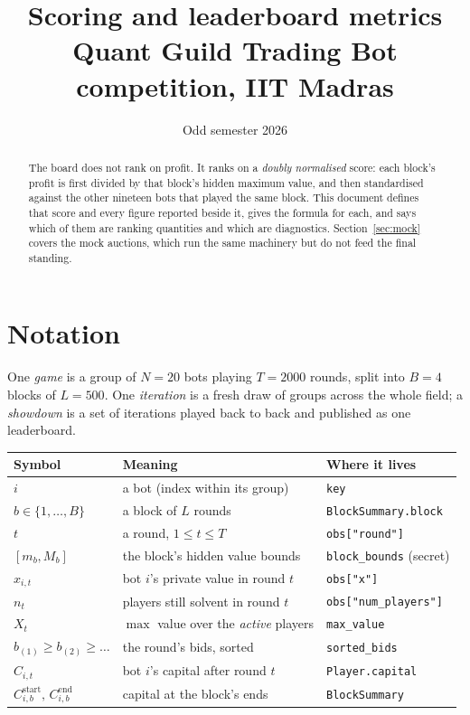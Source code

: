 \documentclass[11pt,a4paper]{article}
\title{\textbf{Scoring and leaderboard metrics}\\[2mm]
       \large Quant Guild Trading Bot competition, IIT Madras}
\author{Odd semester 2026}
\date{}
\newcommand{\code}[1]{\texttt{\small #1}}
\begin{document}
\maketitle

\begin{abstract}
\noindent
The board does not rank on profit. It ranks on a \emph{doubly normalised} score:
each block's profit is first divided by that block's hidden maximum value, and
then standardised against the other nineteen bots that played the same block.
This document defines that score and every figure reported beside it, gives the
formula for each, and says which of them are ranking quantities and which are
diagnostics. Section~\ref{sec:mock} covers the mock auctions, which run the same
machinery but do not feed the final standing.
\end{abstract}

\tableofcontents

\section{Notation}
\label{sec:notation}

One \emph{game} is a group of $N = 20$ bots playing $T = 2000$ rounds, split
into $B = 4$ blocks of $L = 500$. One \emph{iteration} is a fresh draw of groups
across the whole field; a \emph{showdown} is a set of iterations played back to
back and published as one leaderboard.

\begin{center}
\begin{tabular}{@{}lll@{}}
\toprule
Symbol & Meaning & Where it lives \\
\midrule
$i$ & a bot (index within its group) & \code{key} \\
$b \in \{1,\dots,B\}$ & a block of $L$ rounds & \code{BlockSummary.block} \\
$t$ & a round, $1 \le t \le T$ & \code{obs["round"]} \\
$[m_b, M_b]$ & the block's hidden value bounds & \code{block\_bounds} (secret) \\
$x_{i,t}$ & bot $i$'s private value in round $t$ & \code{obs["x"]} \\
$n_t$ & players still solvent in round $t$ & \code{obs["num\_players"]} \\
$X_t$ & $\max$ value over the \emph{active} players & \code{max\_value} \\
$b_{(1)} \ge b_{(2)} \ge \dots$ & the round's bids, sorted & \code{sorted\_bids} \\
$C_{i,t}$ & bot $i$'s capital after round $t$ & \code{Player.capital} \\
$C^{\text{start}}_{i,b},\, C^{\text{end}}_{i,b}$ & capital at the block's ends &
  \code{BlockSummary} \\
\bottomrule
\end{tabular}
\end{center}
\end{document}

